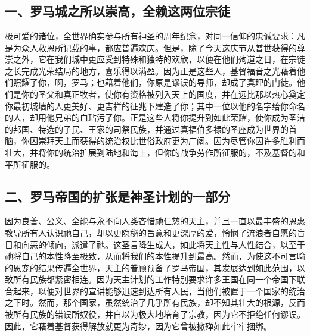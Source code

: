 

\section{}

\par


\subsection{一、罗马城之所以崇高，全赖这两位宗徒}

极可爱的诸位，全世界确实参与所有神圣的周年纪念，对同一信仰的忠诚要求：凡是为众人救恩所记载的事，都应普遍欢庆。但是，除了今天这庆节从普世获得的尊崇之外，它在我们城中更应受到特殊和独特的欢欣，以便在他们殉道之日，在宗徒之长完成光荣结局的地方，喜乐得以满盈。因为正是这些人，基督福音之光藉着他们照耀了你，啊，罗马；也藉着他们，你原是谬误的导师，却成了真理的门徒。他们是你的圣父和真正牧者，使你有资格被列入天上的国度，并在远比那以热心奠定你最初城墙的人更美好、更吉祥的征兆下建造了你；其中一位以他的名字给你命名的人，却用他兄弟的血玷污了你。正是这些人将你提升到如此荣耀，使你成为圣洁的邦国、特选的子民、王家的司祭民族，并通过真福伯多禄的圣座成为世界的首脑，你因崇拜天主而获得的统治权比世俗政府更为广阔。因为尽管你因许多胜利而壮大，并将你的统治扩展到陆地和海上，但你的战争劳作所征服的，不及基督的和平所征服的。\par


\subsection{二、罗马帝国的扩张是神圣计划的一部分}

因为良善、公义、全能与永不向人类吝惜祂仁慈的天主，并且一直以最丰盛的恩惠教导所有人认识祂自己，却以更隐秘的旨意和更深厚的爱，怜悯了流浪者自愿的盲目和向恶的倾向，派遣了祂。这圣言降生成人，如此将天主性与人性结合，以至于祂将自己的本性降至极致，从而将我们的本性提升到最高。然而，为使这不可言喻的恩宠的结果传遍全世界，天主的眷顾预备了罗马帝国，其发展达到如此范围，以致所有民族都紧密相连。因为天主计划的工作特别要求许多王国在同一个帝国下联合起来，以便对世界的宣讲能够迅速到达所有人民，当他们被置于一个国家的统治之下时。然而，那个国家，虽然统治了几乎所有民族，却不知其壮大的根源，反而被所有民族的错误所奴役，并自以为极大地培育了宗教，因为它不拒绝任何谬误。因此，它藉着基督获得解放就更为奇妙，因为它曾被撒殚如此牢牢捆绑。\par

